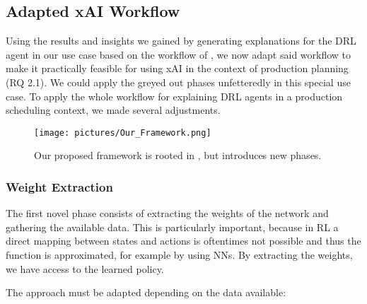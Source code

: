 \subsection{Adapted xAI Workflow}
Using the results and insights we gained by generating explanations for the DRL agent in our use case based on the workflow of , we now adapt said workflow to make it practically feasible for using xAI in the context of production planning (RQ 2.1). We could apply the greyed out phases unfetteredly in this special use case. To apply the whole workflow for explaining DRL agents in a production scheduling context, we made several adjustments.


\begin{figure}[H]
    \centering
    \texttt{[image: pictures/Our\_Framework.png]}
    \caption{Our proposed framework is rooted in , but introduces new phases.}
    \label{fig:tchuente_modified}
\end{figure}

\subsubsection{\textbf{Weight Extraction}}
The first novel phase consists of extracting the weights of the network and gathering the available data. This is particularly important, because in RL a direct mapping between states and actions is oftentimes not possible and thus the function is approximated, for example by using NNs. By extracting the weights, we have access to the learned policy.

The approach must be adapted depending on the data available:

